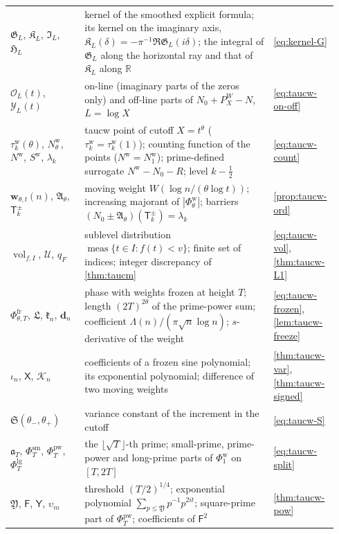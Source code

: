 \documentclass[11pt,a4paper]{article}
\numberwithin{equation}{section}
\theoremstyle{definition}
\theoremstyle{remark}
\newcommand{\meas}{\operatorname{meas}}
\newcommand{\vol}{\operatorname{vol}}
\begin{document}
\begin{longtable}{@{}p{0.22\linewidth}p{0.56\linewidth}p{0.16\linewidth}@{}}
$\mathfrak G_L$, $\mathfrak K_L$, $\mathfrak I_L$, $\mathfrak H_L$ & kernel of the smoothed explicit formula; its kernel on the imaginary axis, $\mathfrak K_L(\delta)=-\pi^{-1}\Re\mathfrak G_L(i\delta)$; the integral of $\mathfrak G_L$ along the horizontal ray and that of $\mathfrak K_L$ along $\mathbb R$ & \eqref{eq:kernel-G}\\
$\mathcal O_L(t)$, $\mathcal Y_L(t)$ & on-line (imaginary parts of the zeros only) and off-line parts of $N_0+P_X^W-N$, $L=\log X$ & \eqref{eq:taucw-on-off}\\
$\tau_k^{\mathrm w}(\theta)$, $N^{\mathrm w}_\theta$, $N^{\mathrm w}$, $S^{\mathrm w}$, $\lambda_k$ & taucw point of cutoff $X=t^\theta$ ($\tau_k^{\mathrm w}=\tau_k^{\mathrm w}(1)$); counting function of the points ($N^{\mathrm w}=N^{\mathrm w}_1$); prime-defined surrogate $N^{\mathrm w}-N_0-R$; level $k-\frac12$ & \eqref{eq:taucw-count}\\
$\mathbf w_{\theta,t}(n)$, $\mathfrak A_\theta$, $\mathsf T_k^\pm$ & moving weight $W(\log n/(\theta\log t))$; increasing majorant of $|\Phi^{\mathrm w}_\theta|$; barriers $(N_0\pm\mathfrak A_\theta)(\mathsf T_k^\pm)=\lambda_k$ & \cref{prop:taucw-ord}\\
$\vol_{f,I}$, $\mathcal U$, $q_F$ & sublevel distribution $\meas\{t\in I:f(t)<v\}$; finite set of indices; integer discrepancy of \cref{thm:taucm} & \eqref{eq:taucw-vol}, \cref{thm:taucw-L1}\\
$\Phi^{\mathrm{fr}}_{\theta,T}$, $\mathfrak L$, $\mathfrak k_n$, $\mathbf d_n$ & phase with weights frozen at height $T$; length $(2T)^{2\theta}$ of the prime-power sum; coefficient $\Lambda(n)/(\pi\sqrt n\log n)$; $s$-derivative of the weight & \eqref{eq:taucw-frozen}, \cref{lem:taucw-freeze}\\
$\iota_n$, $\mathsf X$, $\mathscr K_n$ & coefficients of a frozen sine polynomial; its exponential polynomial; difference of two moving weights & \cref{thm:taucw-var}, \cref{thm:taucw-signed}\\
$\mathfrak S(\theta_-,\theta_+)$ & variance constant of the increment in the cutoff & \eqref{eq:taucw-S}\\
$\mathfrak a_T$, $\Phi^{\mathrm{sm}}_T$, $\Phi^{\mathrm{pw}}_T$, $\Phi^{\mathrm{lg}}_T$ & the $\lfloor\sqrt T\rfloor$-th prime; small-prime, prime-power and long-prime parts of $\Phi^{\mathrm w}_1$ on $[T,2T]$ & \eqref{eq:taucw-split}\\
$\mathfrak Y$, $\mathsf F$, $\mathsf Y$, $\upsilon_m$ & threshold $(T/2)^{1/4}$; exponential polynomial $\sum_{p\le\mathfrak Y}p^{-1}p^{2it}$; square-prime part of $\Phi^{\mathrm{pw}}_T$; coefficients of $\mathsf F^2$ & \cref{thm:taucw-pow}\\

\end{longtable}
\end{document}
